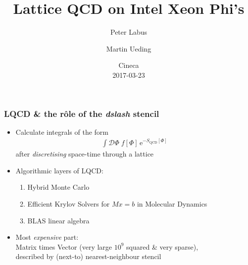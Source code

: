 \documentclass{beamer}
\begin{document}
\allowdisplaybreaks[1]

\title{Lattice QCD on Intel Xeon Phi's}
\author{Peter Labus \and Martin Ueding }
  \date{Cineca \\ 2017-03-23}


  \begin{frame}
    \titlepage
  \end{frame}


  \setcounter{framenumber}{0}

  \begin{frame}
    \frametitle{LQCD \& the r\^ole of the \textit{dslash} stencil}

    \begin{itemize}
      \item  Calculate integrals of the form
        \begin{align*}
          \int \mathcal D \Phi \; f[\Phi] \, \mathrm e^{-S_\text{QCD}[\Phi]}
        \end{align*}
        after \textit{discretising} space-time through a lattice
        \vfill

      \item Algorithmic layers of LQCD:
        \begin{enumerate}
          \item Hybrid Monte Carlo
          \item Efficient Krylov Solvers for $Mx=b$ in Molecular Dynamics
          \item BLAS linear algebra
        \end{enumerate}
        \vfill

      \item Most \textit{expensive} part:\\[1mm]
        \hspace{2mm} Matrix times Vector (very large $10^9$ squared \& very sparse),\\
        \hspace{2mm} described by (next-to) nearest-neighbour stencil
        \vfill
    \end{itemize}

  \end{frame}
\end{document}
